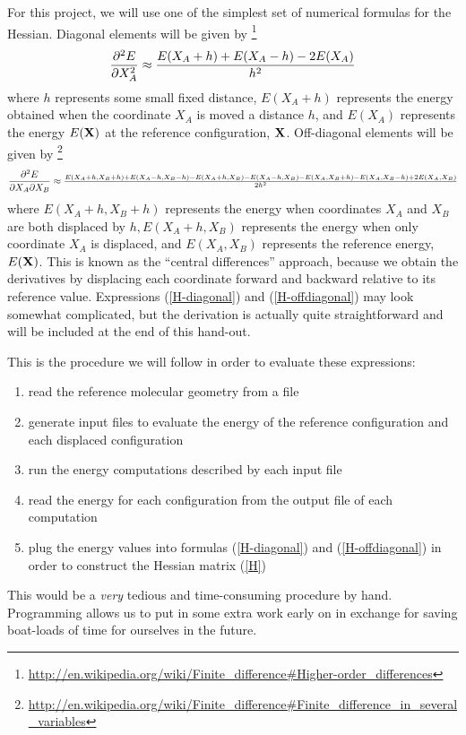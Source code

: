 \documentclass[11pt]{article}
\begin{document}
For this project, we will use one of the simplest set of numerical formulas for
the Hessian. Diagonal elements will be given by
\footnote{\url{http://en.wikipedia.org/wiki/Finite_difference\#Higher-order_differences}}
\begin{align}
    \dfrac{\partial^2 E}{\partial X_A^2} \approx \dfrac{E(X_A+h)+E(X_A-h)-2E(X_A)}{h^2}
    \label{H-diagonal}
\end{align}
where $h$ represents some small fixed distance, $E(X_A+h)$ represents the
energy obtained when the coordinate $X_A$ is moved a distance $h$, and $E(X_A)$
represents the energy $E(\mathbf{X})$ at the reference configuration, $\mathbf{X}$.
Off-diagonal elements will be given by
\footnote{\url{http://en.wikipedia.org/wiki/Finite_difference\#Finite_difference_in_several_variables}}
\begin{align}
    \dfrac{\partial^2 E}{\partial X_A\partial X_B} \approx
    \tfrac{E(X_A+h,X_B+h)+E(X_A-h,X_B-h)
           -E(X_A+h,X_B)-E(X_A-h,X_B)
           -E(X_A,X_B+h)-E(X_A,X_B-h)+2E(X_A,X_B)}{2h^2}
    \label{H-offdiagonal}
\end{align}
where $E(X_A+h,X_B+h)$ represents the energy when coordinates $X_A$ and $X_B$
are both displaced by $h, E(X_A+h,X_B)$ represents the energy when only
coordinate $X_A$ is displaced, and $E(X_A,X_B)$ represents the reference
energy, $E(\mathbf{X})$. This is known as the ``central differences'' approach,
because we obtain the derivatives by displacing each coordinate forward and
backward relative to its reference value. Expressions (\ref{H-diagonal}) and
(\ref{H-offdiagonal}) may look somewhat complicated, but the derivation is
actually quite straightforward and will be included at the end of this
hand-out.

This is the procedure we will follow in order to evaluate these expressions:
\begin{enumerate}
    \item read the reference molecular geometry from a file
    \item generate input files to evaluate the energy of the reference
configuration and each displaced configuration
    \item run the energy computations described by each input file
    \item read the energy for each configuration from the output file of each
computation
    \item plug the energy values into formulas (\ref{H-diagonal}) and
(\ref{H-offdiagonal}) in order to construct the Hessian matrix (\ref{H})
\end{enumerate}
This would be a {\it very} tedious and time-consuming procedure by hand.
Programming allows us to put in some extra work early on in exchange for saving
boat-loads of time for ourselves in the future.
\end{document}
